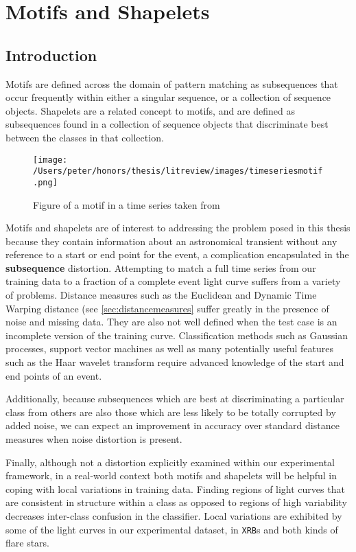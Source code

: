 	
	\pagebreak %
	
	\section{Motifs and Shapelets}
	\subsection{Introduction}
	Motifs are defined across the domain of pattern matching as subsequences that occur frequently within either a singular sequence, or a collection of sequence objects. Shapelets \citep{ye2009time} are a related concept to motifs, and are defined as subsequences found in a collection of sequence objects that discriminate best between the classes in that collection.
	
	\begin{figure}[ht!]
		\label{fig:timeseriesmotif}
		\centering
		\texttt{[image: /Users/peter/honors/thesis/litreview/images/timeseriesmotif.png]}
		\caption{Figure of a motif in a time series taken from \citet{lin2002finding}}
	\end{figure}
	
	Motifs and shapelets are of interest to addressing the problem posed in this thesis because they contain information about an astronomical transient without any reference to a start or end point for the event, a complication encapsulated in the \textbf{subsequence} distortion. Attempting to match a full time series from our training data to a fraction of a complete event light curve suffers from a variety of problems. Distance measures such as the Euclidean and Dynamic Time Warping distance (see \ref{sec:distancemeasures} suffer greatly in the presence of noise and missing data. They are also not well defined when the test case is an incomplete version of the training curve. Classification methods such as Gaussian processes, support vector machines as well as many potentially useful features such as the Haar wavelet transform require advanced knowledge of the start and end points of an event.
	
	Additionally, because subsequences which are best at discriminating a particular class from others are also those which are less likely to be totally corrupted by added noise, we can expect an improvement in accuracy over standard distance measures when noise distortion is present.
	
	Finally, although not a distortion explicitly examined within our experimental framework, in a real-world context both motifs and shapelets will be helpful in coping with local variations in training data. Finding regions of light curves that are consistent in structure within a class as opposed to regions of high variability decreases inter-class confusion in the classifier. Local variations are exhibited by some of the light curves in our experimental dataset, in \verb#XRB#s and both kinds of flare stars.
	
